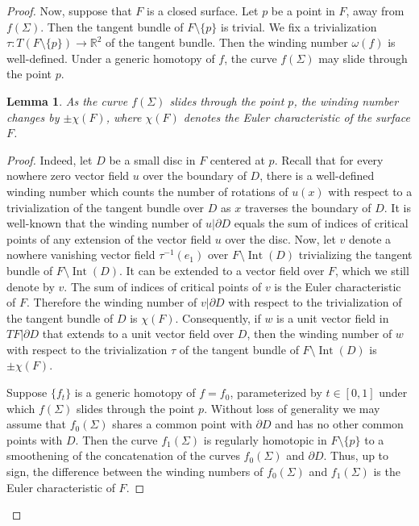 \documentclass[12pt]{amsart}
\def \R{\mathbb{R}}
\def\co{\colon}
\newtheorem{lemma}[theorem]{Lemma}
\theoremstyle{definition}
\begin{document}
{\begin{proof}
 Now, suppose that $F$ is a closed surface. Let $p$ be a point in $F$, away from $f(\Sigma)$. Then the tangent bundle of $F\setminus \{p\}$ is trivial. We fix a trivialization $\tau\co T(F\setminus \{p\})\to \R^2$ of the tangent bundle. Then the winding number $\omega(f)$ is well-defined.   
 Under a generic homotopy of $f$,  the curve $f(\Sigma)$ may slide through the point $p$. 
 
 
 
 \begin{lemma} \label{l:sliding10.1}As the curve $f(\Sigma)$ slides through the point $p$,  the winding number changes by $\pm \chi(F)$, where $\chi(F)$ denotes the Euler characteristic of the surface $F$. 
\end{lemma}
\begin{proof} Indeed, let $D$ be a small disc in $F$ centered at $p$. Recall that for every nowhere zero vector field $u$ over the boundary of $D$, there is a well-defined winding number which counts the number of rotations of $u(x)$ with respect to a trivialization of the tangent bundle over $D$ as $x$ traverses the boundary of $D$.  It is well-known that the winding number of $u|\partial D$ equals the sum of indices of critical points of any extension of the vector field $u$ over the disc.  Now, let $v$ denote a nowhere vanishing vector field $\tau^{-1}(e_1)$ over $F\setminus \mathop\mathrm{Int}(D)$ trivializing the tangent bundle of $F\setminus \mathop\mathrm{Int}(D)$. It can be extended to a vector field over $F$, which we still denote by $v$. The sum of indices of critical points of $v$ is the Euler characteristic of $F$. Therefore the winding number of $v|\partial D$ with respect to the trivialization of the tangent bundle of $D$ is $\chi(F)$. Consequently, if $w$ is a unit vector field in $TF|\partial D$  that extends to a unit vector field over $D$, then the winding number of $w$ with respect to the trivialization $\tau$ of the tangent bundle of $F\setminus \mathop\mathrm{Int}(D)$ is $\pm \chi(F)$.

Suppose $\{f_t\}$ is a generic homotopy of $f=f_0$, parameterized by $t\in [0,1]$ under which $f(\Sigma)$ slides through the point $p$. Without loss of generality we may assume that $f_0(\Sigma)$ shares a common point with $\partial D$ and has no other common points with $D$. Then 
the curve $f_1(\Sigma)$ is regularly homotopic in $F\setminus \{p\}$ to a smoothening of the concatenation of the curves $f_0(\Sigma)$ and $\partial D$. Thus, up to sign, the difference between the winding numbers of $f_0(\Sigma)$ and $f_1(\Sigma)$ is the Euler characteristic of $F$.   
\end{proof} 
 

\end{proof}}
\end{document}
